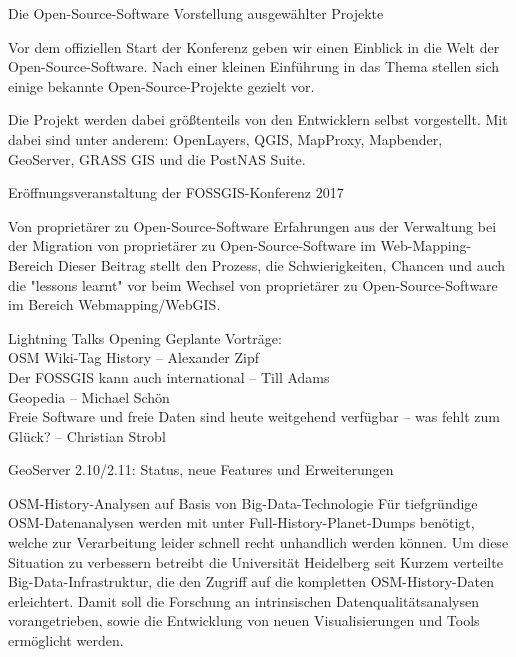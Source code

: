 \renewcommand{\konferenztag}{\mittwoch}
%
{Die Open-Source-Software}%
{Vorstellung ausgewählter Projekte}%
{Vor dem offiziellen Start der Konferenz geben wir einen Einblick in die Welt der Open-Source-Software. Nach einer kleinen Einführung in das Thema stellen sich einige bekannte Open-Source-Projekte gezielt vor.

Die Projekt werden dabei größtenteils von den Entwicklern selbst vorgestellt. Mit dabei sind unter anderem:
OpenLayers, QGIS, MapProxy, Mapbender, GeoServer, GRASS GIS und die PostNAS Suite.}

%
%
{Eröffnungsveranstaltung der FOSSGIS-Konferenz 2017}%
{}%
{}

%
{Von proprietärer zu Open-Source-Software}%
{Erfahrungen aus der Verwaltung bei der Migration von proprietärer zu Open-Source-Software im
Web-Mapping-Bereich}%
{Dieser Beitrag stellt den Prozess, die Schwierigkeiten, Chancen und auch die "lessons learnt" vor
beim Wechsel von proprietärer zu Open-Source-Software im Bereich Webmapping/WebGIS.}

%
\abstractZehn{}%
{Lightning Talks Opening}%
{}%
{Geplante Vorträge:\\
OSM Wiki-Tag History -- Alexander Zipf\\
Der FOSSGIS kann auch international -- Till Adams\\
Geopedia -- Michael Schön\\
Freie Software und freie Daten sind heute weitgehend verfügbar -- was fehlt zum Glück? -- Christian
Strobl}

%
{GeoServer 2.10/2.11: Status, neue Features und Erweiterungen}%
{}%
{%
}

%
{OSM-History-Analysen auf Basis von Big-Data-Technologie}%
{}%
{Für tiefgründige OSM-Datenanalysen werden mit unter Full-History-Planet-Dumps benötigt, welche zur
Verarbeitung leider schnell recht unhandlich werden können. Um diese Situation zu verbessern
betreibt die Universität Heidelberg seit Kurzem verteilte Big-Data-Infrastruktur, die den Zugriff
auf die kompletten OSM-History-Daten erleichtert. Damit soll die Forschung an intrinsischen
Datenqualitätsanalysen vorangetrieben, sowie die Entwicklung von neuen Visualisierungen und Tools
ermöglicht werden.}%

